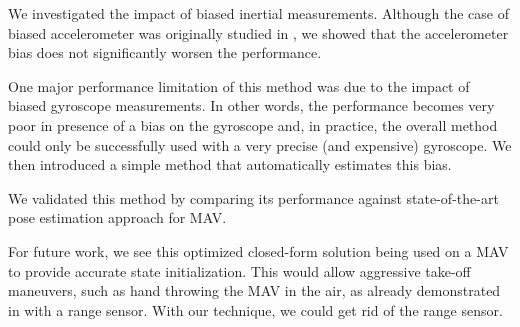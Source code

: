 \documentclass[letterpaper, 10 pt, journal, final]{ieeeconf}  %
\begin{document}
We investigated the impact of biased inertial measurements.
Although the case of biased accelerometer was originally studied in \cite{Martinelli2014}, we showed that the accelerometer bias does not significantly worsen the performance.

One major performance limitation of this method was due to the impact of biased gyroscope measurements.
In other words, the performance becomes very poor in presence of a bias on the gyroscope and, in practice, the overall method could only be successfully used with a very precise (and expensive) gyroscope.
We then introduced a simple method that automatically estimates this bias.



We validated this method by comparing its performance against state-of-the-art pose estimation approach for MAV.

For future work, we see this optimized closed-form solution being used on a MAV to provide accurate state initialization.
This would allow aggressive take-off maneuvers, such as hand throwing the MAV in the air, as already demonstrated in \cite{Faessler2015} with a range sensor.
With our technique, we could get rid of the range sensor.



\end{document}
